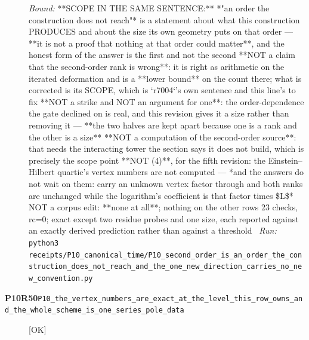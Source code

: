 \begin{description}
 \emph{Bound:}  **SCOPE IN THE SAME SENTENCE:** *"an order the construction does not reach"* is a statement about what this construction PRODUCES and about the size its own geometry puts on that order --- **it is not a proof that nothing at that order could matter**, and the honest form of the answer is the first and not the second  **NOT a claim that the second-order rank is wrong**: it is right as arithmetic on the iterated deformation and is a **lower bound** on the count there; what is corrected is its SCOPE, which is `r7004`'s own sentence and this line's to fix  **NOT a strike and NOT an argument for one**: the order-dependence the gate declined on is real, and this revision gives it a size rather than removing it --- **the two halves are kept apart because one is a rank and the other is a size**  **NOT a computation of the second-order source**: that needs the interacting tower the section says it does not build, which is precisely the scope point  **NOT (4)**, for the fifth revision: the Einstein--Hilbert quartic's vertex numbers are not computed --- *and the answers do not wait on them: carry an unknown vertex factor through and both ranks are unchanged while the logarithm's coefficient is that factor times \$L\$*  NOT a corpus edit: **none at all**; nothing on the other rows  23 checks, rc=0; exact except two residue probes and one size, each reported against an exactly derived prediction rather than against a threshold
\ \emph{Run:} \texttt{python3 receipts/P10\_canonical\_time/P10\_second\_order\_is\_an\_order\_the\_construction\_does\_not\_reach\_and\_the\_one\_new\_direction\_carries\_no\_new\_convention.py}
\item[\rcptlabel{P10_the_vertex_numbers_are_exact_at_the_level_this_row_owns_and_the_whole_scheme_is_one_series_pole_data}{P10R50}\textbf{P10R50}\quad\texttt{P10\_the\_vertex\_numbers\_are\_exact\_at\_the\_level\_this\_row\_owns\_and\_the\_whole\_scheme\_is\_one\_series\_pole\_data}]\hfill\textsf{[OK]}\\

\end{description}
